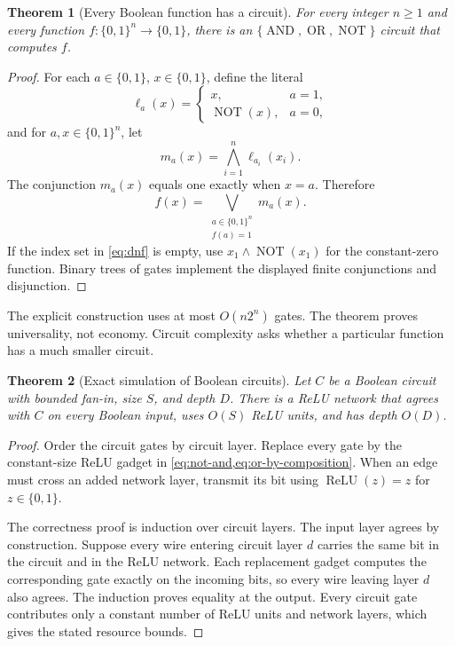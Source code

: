 \documentclass[11pt,twoside]{article}
\newcommand{\relu}{\operatorname{ReLU}}
\newcommand{\NOT}{\operatorname{NOT}}
\newcommand{\AND}{\operatorname{AND}}
\newcommand{\OR}{\operatorname{OR}}
\newtheorem{theorem}{Theorem}[section]
\theoremstyle{definition}
\theoremstyle{remark}
\begin{document}
\begin{theorem}[Every Boolean function has a circuit]
\label{thm:boolean-universality}
For every integer $n\geq1$ and every function
$f:\{0,1\}^n\to\{0,1\}$, there is an $\{\AND,\OR,\NOT\}$ circuit that
computes $f$.
\end{theorem}

\begin{proof}
For each $a\in\{0,1\}$, $x\in \{0,1\}$, define the literal
\[
 \ell_{a}(x)=
 \begin{cases}
  x,&a=1,\\
  \NOT(x),&a=0,
 \end{cases}
 \]
and for $a,x\in \{0,1\}^n$, let
\[
 m_a(x)=\bigwedge_{i=1}^n\ell_{a_i}(x_i).
\]
The conjunction $m_a(x)$ equals one exactly when $x=a$. Therefore
\begin{equation}
 f(x)=\bigvee_{\substack{a\in\{0,1\}^n\\ f(a)=1}}m_a(x).
 \label{eq:dnf}
\end{equation}
If the index set in \cref{eq:dnf} is empty, use
$x_1\land\NOT(x_1)$ for the constant-zero function. Binary trees of gates
implement the displayed finite conjunctions and disjunction.
\end{proof}

The explicit construction uses at most $O(n2^n)$ gates. The theorem proves
universality, not economy. Circuit complexity asks whether a particular
function has a much smaller circuit.

\begin{theorem}[Exact simulation of Boolean circuits]
\label{thm:circuit-simulation}
Let $C$ be a Boolean circuit with bounded fan-in, size $S$, and depth $D$.
There is a ReLU network that agrees with $C$ on every Boolean input, uses
$O(S)$ ReLU units, and has depth $O(D)$.
\end{theorem}

\begin{proof}
Order the circuit gates by circuit layer. Replace every gate by the
constant-size ReLU gadget in \cref{eq:not-and,eq:or-by-composition}. When an
edge must cross an added network layer, transmit its bit using
$\relu(z)=z$ for $z\in\{0,1\}$.

The correctness proof is induction over circuit layers. The input layer
agrees by construction. Suppose every wire entering circuit layer $d$
carries the same bit in the circuit and in the ReLU network. Each replacement
gadget computes the corresponding gate exactly on the incoming bits, so every wire
leaving layer $d$ also agrees. The induction proves equality at the output.
Every circuit gate contributes only a constant number of ReLU units and
network layers, which gives the stated resource bounds.
\end{proof}
\end{document}
